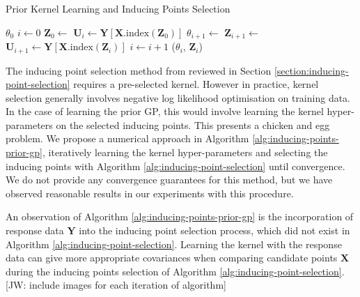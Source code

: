 \documentclass{article}
\newcommand{\jw}[1]{{\color{gray} [JW: #1]}}
\numberwithin{equation}{section}
\begin{document}
\begin{algorithm}[h!]
\caption{Prior Kernel Learning and Inducing Points Selection}\label{alg:inducing-points-prior-gp}
\begin{algorithmic}
\Require $\theta_0$ 
 \State $i \leftarrow 0$
  \State $\mathbf{Z}_0 \leftarrow$  
  \State $\mathbf{U}_i \leftarrow \mathbf{Y}\left[\mathbf{X}.\text{index}\left(\mathbf{Z}_0\right)\right]$ 
\State $\theta_{i+1} \leftarrow$  
\State $\mathbf{Z}_{i+1} \leftarrow$ 
\State $\mathbf{U}_{i+1} \leftarrow \mathbf{Y}\left[\mathbf{X}.\text{index}\left(\mathbf{Z}_i\right)\right]$
\State $i \leftarrow i+1$
\EndWhile
\State \Return ($\theta_i$, $\mathbf{Z}_i$)
\end{algorithmic}
\end{algorithm}

The inducing point selection method from \cite{burt2020convergence} reviewed in Section \ref{section:inducing-point-selection} requires a pre-selected kernel.
However in practice, kernel selection generally involves negative log likelihood optimisation on training data.
In the case of learning the prior GP, this would involve learning the kernel hyper-parameters on the selected inducing points.
This presents a chicken and egg problem.
We propose a numerical approach in Algorithm \ref{alg:inducing-points-prior-gp}, iteratively learning the kernel hyper-parameters and selecting the inducing points with Algorithm \ref{alg:inducing-point-selection} until convergence.
We do not provide any convergence guarantees for this method, but we have observed reasonable results in our experiments with this procedure.

An observation of Algorithm \ref{alg:inducing-points-prior-gp} is the incorporation of response data $\mathbf{Y}$ into the inducing point selection process, which did not exist in Algorithm \ref{alg:inducing-point-selection}. Learning the kernel with the response data can give more appropriate covariances when comparing candidate points $\mathbf{X}$ during the inducing points selection of Algorithm \ref{alg:inducing-point-selection}. \jw{include images for each iteration of algorithm}
\end{document}
